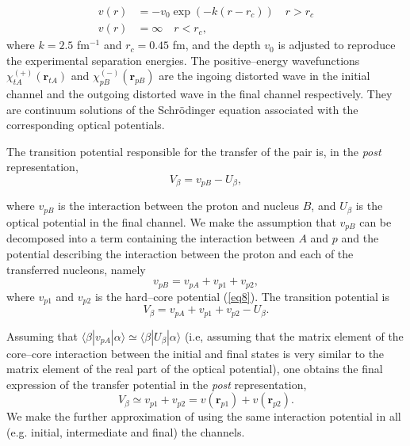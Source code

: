 \documentclass[a4paper,14pt]{book}
\begin{document}
\begin{align}\label{eq8}
v(r)&=-v_0\exp\left(-k(r-r_c)\right) \quad r>r_c\\
v(r)&=\infty \quad r<r_c,
\end{align}
where $k=2.5$ fm$^{-1}$ and $r_c=0.45$ fm, and the depth $v_0$ is adjusted to reproduce the experimental separation energies.
The positive--energy wavefunctions  $\chi^{(+)}_{tA}(\mathbf{r}_{tA})$ and $\chi^{(-)}_{pB}(\mathbf{r}_{pB})$ are the ingoing distorted wave in the initial channel and the outgoing distorted wave in the final channel respectively. They are continuum solutions of the Schr\"{o}dinger equation associated with the corresponding optical potentials.


The transition potential responsible for the transfer of the pair is, in the \emph{post} representation,
\begin{equation}\label{eq1_43}
    V_\beta=v_{pB}-U_{\beta},
\end{equation}

where $v_{pB}$ is the interaction between the proton and nucleus $B$, and $U_{\beta}$ is the optical potential in the final channel. We make the assumption that $v_{pB}$ can be decomposed into a term containing the interaction between $A$ and $p$ and the potential describing the interaction between the proton and each of the transferred nucleons, namely
\begin{equation}\label{eq1_44}
    v_{pB}=v_{pA}+v_{p1}+v_{p2},
\end{equation}
where $v_{p1}$ and $v_{p2}$ is the hard--core potential (\ref{eq8}). The transition potential is
\begin{equation}\label{eq1_45}
    V_\beta=v_{pA}+v_{p1}+v_{p2}-U_{\beta}.
\end{equation}

Assuming that $\langle \beta |v_{pA}|\alpha \rangle \simeq \langle \beta |U_{\beta}|\alpha \rangle $ (i.e, assuming that the matrix element of the core--core interaction between the initial and final states is very similar to the matrix element of the real part of the optical potential), one obtains the final expression of the transfer potential in the \emph{post} representation,
\begin{equation}\label{eq1_45x}
    V_\beta\simeq v_{p1}+v_{p2}=v(\mathbf{r}_{p1})+v(\mathbf{r}_{p2}).
\end{equation}
We make the further approximation of using the same interaction potential in all (e.g. initial, intermediate and final) the channels.
\end{document}

